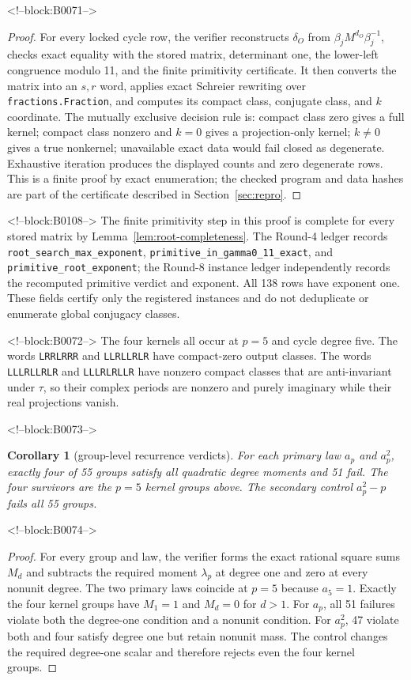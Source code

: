 \documentclass[11pt]{article}
\newtheorem{corollary}[theorem]{Corollary}
\theoremstyle{definition}
\theoremstyle{remark}
\begin{document}
<!--block:B0071-->
\begin{proof}
For every locked cycle row, the verifier reconstructs $\delta_O$ from $\beta_jM^{d_O}\beta_j^{-1}$, checks exact equality with the stored matrix, determinant one, the lower-left congruence modulo 11, and the finite primitivity certificate. It then converts the matrix into an $s,r$ word, applies exact Schreier rewriting over \texttt{fractions.Fraction}, and computes its compact class, conjugate class, and $k$ coordinate. The mutually exclusive decision rule is: compact class zero gives a full kernel; compact class nonzero and $k=0$ gives a projection-only kernel; $k\neq0$ gives a true nonkernel; unavailable exact data would fail closed as degenerate. Exhaustive iteration produces the displayed counts and zero degenerate rows. This is a finite proof by exact enumeration; the checked program and data hashes are part of the certificate described in Section~\ref{sec:repro}.
\end{proof}

<!--block:B0108-->
The finite primitivity step in this proof is complete for every stored matrix by Lemma~\ref{lem:root-completeness}. The Round-4 ledger records \texttt{root\_search\_max\_exponent}, \texttt{primitive\_in\_gamma0\_11\_exact}, and \texttt{primitive\_root\_exponent}; the Round-8 instance ledger independently records the recomputed primitive verdict and exponent. All 138 rows have exponent one. These fields certify only the registered instances and do not deduplicate or enumerate global conjugacy classes.

<!--block:B0072-->
The four kernels all occur at $p=5$ and cycle degree five. The words \texttt{LRRLRRR} and \texttt{LLRLLRLR} have compact-zero output classes. The words \texttt{LLLRLLRLR} and \texttt{LLLRLRLLR} have nonzero compact classes that are anti-invariant under $\tau$, so their complex periods are nonzero and purely imaginary while their real projections vanish.

<!--block:B0073-->
\begin{corollary}[group-level recurrence verdicts]\label{cor:groups}
For each primary law $a_p$ and $a_p^2$, exactly four of 55 groups satisfy all quadratic degree moments and 51 fail. The four survivors are the $p=5$ kernel groups above. The secondary control $a_p^2-p$ fails all 55 groups.
\end{corollary}

<!--block:B0074-->
\begin{proof}
For every group and law, the verifier forms the exact rational square sums $M_d$ and subtracts the required moment $\lambda_p$ at degree one and zero at every nonunit degree. The two primary laws coincide at $p=5$ because $a_5=1$. Exactly the four kernel groups have $M_1=1$ and $M_d=0$ for $d>1$. For $a_p$, all 51 failures violate both the degree-one condition and a nonunit condition. For $a_p^2$, 47 violate both and four satisfy degree one but retain nonunit mass. The control changes the required degree-one scalar and therefore rejects even the four kernel groups.
\end{proof}
\end{document}
